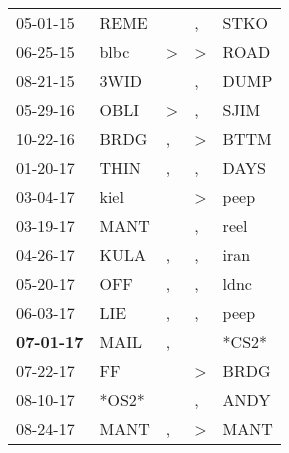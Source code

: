 \begin{supertabular}{p{0.07\textwidth}p{0.06\textwidth}p{0.02\textwidth}p{0.02\textwidth}p{0.06\textwidth}}
          05-01-15\textsuperscript{} &  REME\textsuperscript{} &                  &             , &  STKO\textsuperscript{} \\
          06-25-15\textsuperscript{} &  blbc\textsuperscript{} &     \textgreater &  \textgreater &  ROAD\textsuperscript{} \\
          08-21-15\textsuperscript{} &  3WID\textsuperscript{} &                  &             , &  DUMP\textsuperscript{} \\
          05-29-16\textsuperscript{} &  OBLI\textsuperscript{} &     \textgreater &             , &  SJIM\textsuperscript{} \\
          10-22-16\textsuperscript{} &  BRDG\textsuperscript{} &                , &  \textgreater &  BTTM\textsuperscript{} \\
          01-20-17\textsuperscript{} &  THIN\textsuperscript{} &                , &             , &  DAYS\textsuperscript{} \\
          03-04-17\textsuperscript{} &  kiel\textsuperscript{} &                  &  \textgreater &  peep\textsuperscript{} \\
          03-19-17\textsuperscript{} &  MANT\textsuperscript{} &                  &             , &  reel\textsuperscript{} \\
          04-26-17\textsuperscript{} &  KULA\textsuperscript{} &                , &             , &  iran\textsuperscript{} \\
          05-20-17\textsuperscript{} &   OFF\textsuperscript{} &                , &             , &  ldnc\textsuperscript{} \\
          06-03-17\textsuperscript{} &   LIE\textsuperscript{} &                , &             , &  peep\textsuperscript{} \\
 \textbf{07-01-17\textsuperscript{}} &  MAIL\textsuperscript{} &                , &               &                   *CS2* \\
          07-22-17\textsuperscript{} &    FF\textsuperscript{} &                  &  \textgreater &  BRDG\textsuperscript{} \\
          08-10-17\textsuperscript{} &                   *OS2* &                  &             , &  ANDY\textsuperscript{} \\
          08-24-17\textsuperscript{} &  MANT\textsuperscript{} &                , &  \textgreater &  MANT\textsuperscript{} \\

\end{supertabular}
